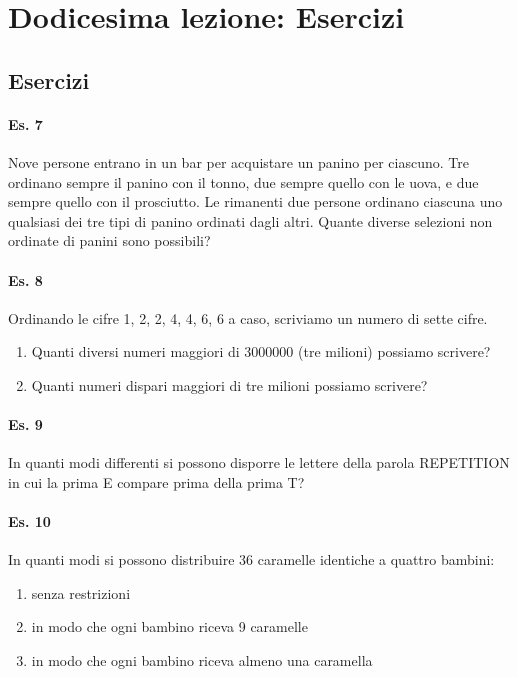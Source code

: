 \section{Dodicesima lezione: Esercizi}

\subsection{Esercizi}

\paragraph{Es. 7} Nove persone entrano in un bar per acquistare un panino per ciascuno.
Tre ordinano sempre il panino con il tonno,
due sempre quello con le uova,
e due sempre quello con il prosciutto.
Le rimanenti due persone ordinano ciascuna uno qualsiasi dei tre tipi di panino ordinati dagli altri.
Quante diverse selezioni non ordinate di panini sono possibili?

\paragraph{Es. 8}Ordinando le cifre 1, 2, 2, 4, 4, 6, 6 a caso, scriviamo un numero di sette cifre.
\begin{enumerate}
    \item Quanti diversi numeri maggiori di 3000000 (tre milioni) possiamo scrivere?
     \item Quanti numeri dispari maggiori di tre milioni possiamo scrivere?
\end{enumerate}

\paragraph{Es. 9}In quanti modi differenti si possono disporre le lettere della parola REPETITION
in cui la prima E compare prima della prima T?

\paragraph{Es. 10} In quanti modi si possono distribuire 36 caramelle identiche a quattro bambini:
\begin{enumerate}
    \item senza restrizioni
    \item in modo che ogni bambino riceva 9 caramelle
    \item in modo che ogni bambino riceva almeno una caramella
\end{enumerate}

